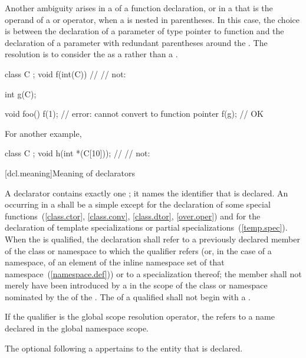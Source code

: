 \pnum
Another ambiguity arises in a
of a function declaration, or in a
that is the operand of a
or
operator, when a
is nested in parentheses.
In this case, the choice is between the declaration of a parameter of type
pointer to function and the declaration of a parameter with redundant
parentheses around the
.
The resolution is to consider the
as a
rather than a
.
\begin{example}

\begin{codeblock}
class C { };
void f(int(C)) { }              // 
                                // not: 

int g(C);

void foo() {
  f(1);                         // error: cannot convert  to function pointer
  f(g);                         // OK
}
\end{codeblock}

For another example,

\begin{codeblock}
class C { };
void h(int *(C[10]));           // 
                                // not: 
\end{codeblock}
\end{example}

[dcl.meaning]{Meaning of declarators}%

\pnum
{}%
A declarator contains exactly one
;
it names the identifier that is declared.
An
occurring in
a
shall be a simple
except for the declaration of some special functions~(\ref{class.ctor},
\ref{class.conv}, \ref{class.dtor}, \ref{over.oper}) and
for the declaration of template specializations
or partial specializations~(\ref{temp.spec}).
When the
is qualified, the declaration shall refer to a previously declared member
of the class or namespace to which the qualifier refers (or,
in the case of a namespace,
of an element of the inline namespace
set of that namespace~(\ref{namespace.def})) or to a specialization thereof; the member
shall not merely have been introduced by a
in the scope of the class or namespace nominated by the
of the
.
The  of a qualified  shall not
begin with a .
\begin{note}
If the qualifier is the global
\tcode{::}
scope resolution operator, the
refers to a name declared in the global namespace scope.
\end{note}
The optional  following a  appertains to the entity that is declared.

